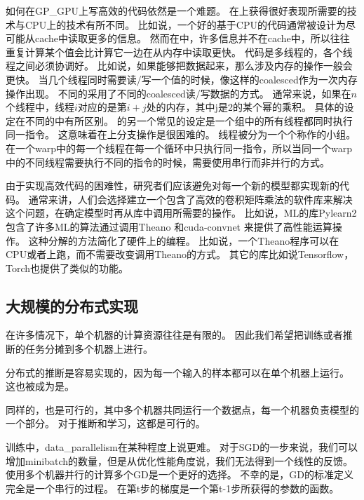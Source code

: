 如何在\gls{GP_GPU}上写高效的代码依然是一个难题。
在上获得很好表现所需要的技术与CPU上的技术有所不同。
比如说，一个好的基于CPU的代码通常被设计为尽可能从cache中读取更多的信息。
然而在中，许多信息并不在cache中，所以往往重复计算某个值会比计算它一边在从内存中读取更快。
代码是多线程的，各个线程之间必须协调好。
比如说，如果能够把数据起来，那么涉及内存的操作一般会更快。
当几个线程同时需要读/写一个值的时候，像这样的\gls{coalesced}作为一次内存操作出现。
不同的采用了不同的\gls{coalesced}读/写数据的方式。
通常来说，如果在$n$个线程中，线程$i$对应的是第$i+j$处的内存，其中j是2的某个幂的乘积。
具体的设定在不同的中有所区别。
的另一个常见的设定是一个组中的所有线程都同时执行同一指令。
这意味着在上分支操作是很困难的。
线程被分为一个个称作的小组。
在一个\gls{warp}中的每一个线程在每一个循环中只执行同一指令，所以当同一个\gls{warp}中的不同线程需要执行不同的指令的时候，需要使用串行而非并行的方式。


由于实现高效代码的困难性，研究者们应该避免对每一个新的模型都实现新的代码。
通常来讲，人们会选择建立一个包含了高效的卷积矩阵乘法的软件库来解决这个问题，在确定模型时再从库中调用所需要的操作。
比如说，\gls{ML}的库Pylearn2 \citep{pylearn2_arxiv_2013} 包含了许多\gls{ML}的算法通过调用Theano \citep{bergstra+al:2010-scipy-short,Bastien-2012}和cuda-convnet \citep{Krizhevsky2010tr}来提供了高性能运算操作。
这种分解的方法简化了硬件上的编程。
比如说，一个Theano程序可以在CPU或者上跑，而不需要改变调用Theano的方式。
其它的库比如说Tensorflow\citep{tensorflow}，Torch\citep{Torch-2011}也提供了类似的功能。


\subsection{大规模的分布式实现}
\label{sec:large_scale_distributed_implementations}

在许多情况下，单个机器的计算资源往往是有限的。
因此我们希望把训练或者推断的任务分摊到多个机器上进行。

分布式的推断是容易实现的，因为每一个输入的样本都可以在单个机器上运行。
这也被成为是。

同样的，也是可行的，其中多个机器共同运行一个数据点，每一个机器负责模型的一个部分。
对于推断和学习，这都是可行的。


训练中，\gls{data_parallelism}在某种程度上说更难。
对于\gls{SGD}的一步来说，我们可以增加\gls{minibatch}的数量，但是从优化性能角度说，我们无法得到一个线性的反馈。
使用多个机器并行的计算多个\gls{GD}是一个更好的选择。
不幸的是，\gls{GD}的标准定义完全是一个串行的过程。
在第t步的梯度是一个第t-1步所获得的参数的函数。


